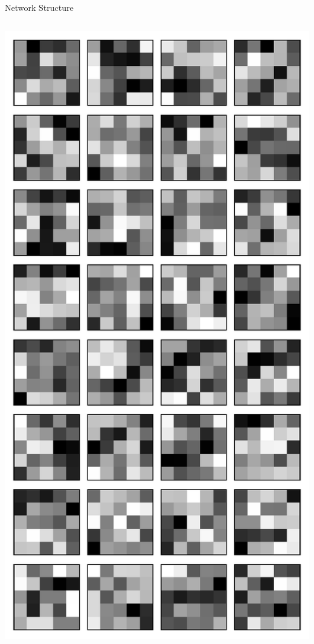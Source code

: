 \documentclass[10pt, aspectratio=169]{beamer} %
\begin{document}
\begin{frame}[fragile]{Network Structure}
\begin{columns}
\includegraphics[width=\textwidth]{keras_l1_filters.pdf}
\end{columns}
\end{frame}
\end{document}
